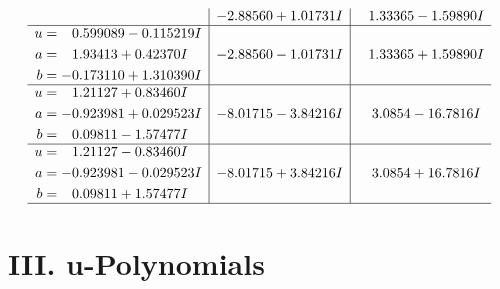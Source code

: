 \documentclass[1p]{elsarticle_modified}
\theoremstyle{definition}
\begin{document}
$$\begin{array}{c|c|c}
 & -2.88560 + 1.01731 I & \phantom{-}1.33365 - 1.59890 I \\ \hline\begin{aligned}
u &= \phantom{-}0.599089 - 0.115219 I \\
a &= \phantom{-}1.93413 + 0.42370 I \\
b &= -0.173110 + 1.310390 I\end{aligned}
 & -2.88560 - 1.01731 I & \phantom{-}1.33365 + 1.59890 I \\ \hline\begin{aligned}
u &= \phantom{-}1.21127 + 0.83460 I \\
a &= -0.923981 + 0.029523 I \\
b &= \phantom{-}0.09811 - 1.57477 I\end{aligned}
 & -8.01715 - 3.84216 I & \phantom{-}3.0854 - 16.7816 I \\ \hline\begin{aligned}
u &= \phantom{-}1.21127 - 0.83460 I \\
a &= -0.923981 - 0.029523 I \\
b &= \phantom{-}0.09811 + 1.57477 I\end{aligned}
 & -8.01715 + 3.84216 I & \phantom{-}3.0854 + 16.7816 I\\
 \hline 
 \end{array}$$\newpage
\newpage\renewcommand{\arraystretch}{1}
\centering \section*{ III. u-Polynomials}
\end{document}
